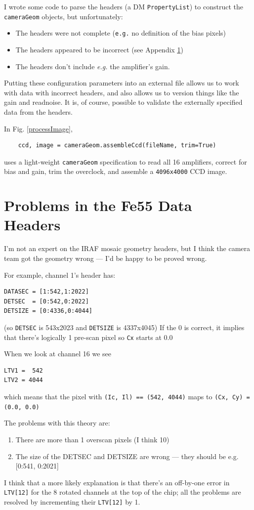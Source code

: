 \documentclass[12pt]{article}
\begin{document}
I wrote some code to parse the headers (a DM \texttt{PropertyList}) to construct the \texttt{cameraGeom}
objects, but unfortunately:
\begin{itemize}
  \item The headers were not complete (\texttt{e.g.} no definition of the bias pixels)
  \item The headers appeared to be incorrect (see Appendix \ref{badHeader})
  \item The headers don't include \textit{e.g.} the amplifier's gain.
\end{itemize}

Putting these configuration parameters into an external file allows us to work with data with incorrect
headers, and also allows us to version things like the gain and readnoise.  It is, of course, possible
to validate the externally specified data from the headers.

In Fig. \ref{processImage},
\begin{lstlisting}
    ccd, image = cameraGeom.assembleCcd(fileName, trim=True)
\end{lstlisting}
uses a light-weight \texttt{cameraGeom} specification to read all 16 amplifiers, correct for bias
and gain, trim the overclock, and assemble a \texttt{4096x4000} CCD image.

\appendix
\section{Problems in the Fe55 Data Headers}
\label{badHeader}

I'm not an expert on the IRAF mosaic geometry headers, but I think the camera team got the geometry wrong ---
I'd be happy to be proved wrong.

For example, channel 1's header has:
\begin{verbatim}
DATASEC = [1:542,1:2022]
DETSEC  = [0:542,0:2022]
DETSIZE = [0:4336,0:4044]
\end{verbatim}
(so \texttt{DETSEC} is  543x2023 and \texttt{DETSIZE} is 4337x4045)
If the 0 is correct, it implies that there's logically 1 pre-scan pixel so \texttt{Cx} starts at 0.0

When we look at channel 16 we see
\begin{verbatim}
LTV1 =  542
LTV2 = 4044
\end{verbatim}
which means that the pixel with \texttt{(Ic, Il) == (542, 4044)} maps to \texttt{(Cx, Cy) = (0.0, 0.0)}

The problems with this theory are:
\begin{enumerate}
\item There are more than 1 overscan pixels (I think 10)
\item The size of the DETSEC and DETSIZE are wrong --- they should be e.g. [0:541, 0:2021]
\end{enumerate}

I think that a more likely explanation is that there's an off-by-one error in \texttt{LTV[12]} for the 8
rotated channels at the top of the chip; all the problems are resolved by incrementing their \texttt{LTV[12]}
by 1.
\end{document}
